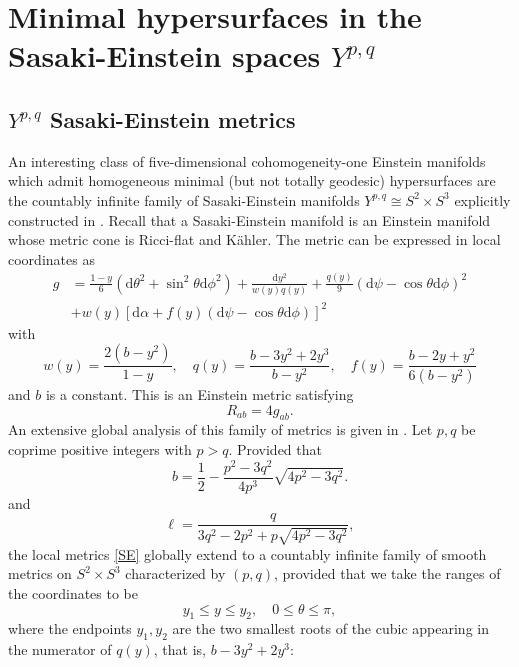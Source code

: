 \documentclass[11pt]{amsart}
\theoremstyle{plain}
\newcommand{\td}{\text{d}}
\theoremstyle{definition}
\numberwithin{equation}{section}
\begin{document}
\section{Minimal hypersurfaces in the Sasaki-Einstein spaces $Y^{p,q}$}
\subsection{$Y^{p,q}$ Sasaki-Einstein metrics}
An interesting class of five-dimensional cohomogeneity-one Einstein manifolds which admit homogeneous minimal (but not totally geodesic) hypersurfaces are the countably infinite family of Sasaki-Einstein manifolds $Y^{p,q} \cong S^2 \times S^3$ explicitly constructed in \cite{Gauntlett:2004yd}. Recall that a Sasaki-Einstein manifold is an Einstein manifold whose metric cone is Ricci-flat and K\"ahler.  The metric can be expressed in local coordinates as 
\begin{equation}\label{SE}
\begin{aligned}
    g &= \frac{1-y}{6} (\td \theta^2 + \sin^2\theta \td \phi^2) + \frac{\td y^2}{w(y) q(y)} + \frac{q(y)}{9} (\td \psi - \cos\theta \td \phi)^2 \\
    & + w(y) \left[ \td \alpha + f(y)(\td \psi - \cos\theta \td \phi)\right]^2
\end{aligned}
\end{equation} with
\begin{equation}
    w(y) = \frac{2(b-y^2)}{1-y}, \quad q(y) = \frac{b - 3 y^2 + 2 y^3}{b-y^2}, \quad f(y) = \frac{b - 2y + y^2}{6(b-y^2)}
\end{equation} and $b$ is a constant. This is an Einstein metric satisfying
\begin{equation}
    R_{ab} = 4 g_{ab}.
\end{equation} An extensive global analysis of this family of metrics is given in \cite{Gauntlett:2004yd}. Let $p,q$ be coprime positive integers with $ p > q$. Provided that 
\begin{equation}
    b = \frac{1}{2} - \frac{p^2 - 3q^2}{4p^3} \sqrt{4p^2 - 3 q^2}.
\end{equation} and 
\begin{equation}
    \ell = \frac{q}{3 q^2 - 2 p^2 + p \sqrt{4p^2 - 3 q^2}},
\end{equation} the local metrics \eqref{SE} globally extend to a countably infinite family of  smooth metrics on $S^2 \times S^3$ characterized by $(p,q)$, provided that we take the ranges of the coordinates to be
\begin{equation}
    y_1 \leq y \leq y_2, \quad 0 \leq \theta \leq \pi, 
\end{equation} where the endpoints $y_1, y_2$ are the two smallest roots of the cubic appearing in the numerator of $q(y)$, that is, $b - 3 y^2 + 2y^3$:
\end{document}
